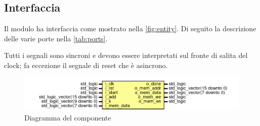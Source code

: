 \documentclass[11pt,a4paper]{article}
\begin{document}
\subsection{Interfaccia}

Il modulo ha interfaccia come mostrato nella \autoref{fig:entity}. Di seguito la descrizione delle varie porte nella \autoref{tab:ports}.

Tutti i segnali sono sincroni e devono essere interpretati sul fronte di salita del clock; fa eccezione il segnale di reset che è asincrono.
\begin{figure}[H]
    \centering
    \includegraphics[scale=.45]{resources/entity.png}
    \caption{Diagramma del componente}
    \label{fig:entity}
\end{figure}
\end{document}
